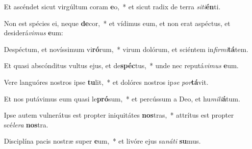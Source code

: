 \item Et ascéndet sicut virgúltum coram \textbf{e}o,~* et sicut radix de terra \textit{si}\textit{ti}\textbf{én}ti.
\item Non est spécies ei, neque \textbf{de}cor,~* et vídimus eum, et non erat aspéctus, et desiderá\textit{vi}\textit{mus} \textbf{e}um:
\item Despéctum, et novíssimum vi\textbf{ró}rum,~* virum dolórum, et sciéntem in\textit{fir}\textit{mi}\textbf{tá}tem.
\item Et quasi abscónditus vultus ejus, et de\textbf{spéc}tus,~* unde nec reputá\textit{vi}\textit{mus} \textbf{e}um.
\item Vere languóres nostros ipse \textbf{tu}lit,~* et dolóres nostros ip\textit{se} \textit{por}\textbf{tá}vit.
\item Et nos putávimus eum quasi le\textbf{pró}sum,~* et percússum a Deo, et hu\textit{mi}\textit{li}\textbf{á}tum.
\item Ipse autem vulnerátus est propter iniquitátes \textbf{nos}tras,~* attrítus est propter scé\textit{le}\textit{ra} \textbf{nos}tra.
\item Disciplína pacis nostræ super \textbf{e}um,~* et livóre ejus sa\textit{ná}\textit{ti} \textbf{su}mus.
